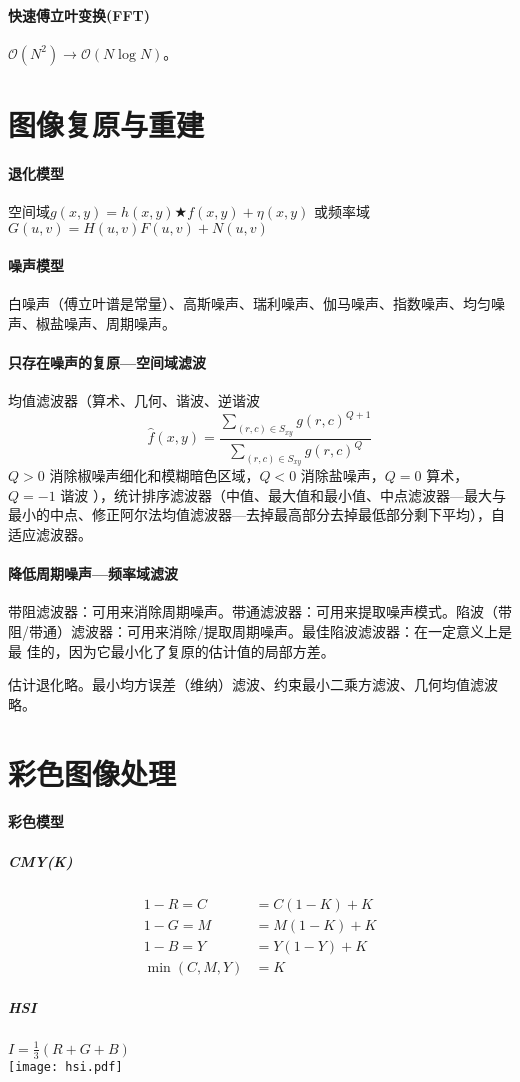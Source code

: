 \documentclass[twocolumn]{ctexart}
\begin{document}
\paragraph{快速傅立叶变换(FFT)} $\mathcal{O}(N^2)\rightarrow \mathcal{O}(N\log N)$。
\section{图像复原与重建}
\paragraph{退化模型} 空间域$g(x,y)=h(x,y)\bigstar f(x,y)+\eta(x,y)$ 或频率域 $G(u,v)=H(u,v)F(u,v)+N(u,v)$
\paragraph{噪声模型} 白噪声（傅立叶谱是常量）、高斯噪声、瑞利噪声、伽马噪声、指数噪声、均匀噪声、椒盐噪声、周期噪声。
\paragraph{只存在噪声的复原---空间域滤波} 均值滤波器（算术、几何、谐波、逆谐波
$$\hat{f}(x,y)=\frac{\sum_{(r,c)\in S_{xy}}g(r,c)^{Q+1}}{\sum_{(r,c)\in S_{xy}}g(r,c)^Q}$$
$Q>0$ 消除椒噪声细化和模糊暗色区域，$Q<0$ 消除盐噪声，$Q=0$ 算术，$Q=-1$ 谐波
），统计排序滤波器（中值、最大值和最小值、中点滤波器---最大与最小的中点、修正阿尔法均值滤波器---去掉最高部分去掉最低部分剩下平均），自适应滤波器。
\paragraph{降低周期噪声---频率域滤波} 带阻滤波器：可⽤来消除周期噪声。带通滤波器：可⽤来提取噪声模式。陷波（带阻/带通）滤波器：可⽤来消除/提取周期噪声。最佳陷波滤波器：在⼀定意义上是最
佳的，因为它最⼩化了复原的估计值的局部⽅差。

估计退化略。最小均方误差（维纳）滤波、约束最小二乘方滤波、几何均值滤波略。
\section{彩色图像处理}
\paragraph{彩色模型}
\subparagraph{CMY(K)}
\begin{align*}
    1-R = C&=C(1-K)+K\\
    1-G = M&=M(1-K)+K\\
    1-B = Y&=Y(1-Y)+K\\
    \min(C,M,Y)&=K
\end{align*}
\subparagraph{HSI} $I=\frac{1}{3}(R+G+B)$\\
\texttt{[image: hsi.pdf]}
\end{document}

